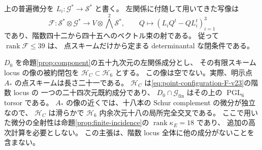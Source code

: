 上の普遍微分を $L_i:\mathscr G^*\to\mathscr S^*$ と書く。
左関係に付随して用いてきた写像は
\begin{equation}\label{eq:point-configuration-F-v23}
 \mathcal F:\mathscr S^*\otimes\mathscr G^*
 \longrightarrow V\otimes\bigwedge^2\mathscr S^*,
 \qquad
 Q\longmapsto(L_iQ^t-QL_i^t)_{i=1}^3
\end{equation}
であり、階数四十二から四十五へのベクトル束の射である。
従って $\operatorname{rank}\mathcal F\le39$ は、
点スキームだけから定まる determinantal な閉条件である。

$D_0$ を命題\ref{prop:component}の五十九次元の左関係成分とし、
その有限スキーム locus の像の被約閉包を $\mathcal H_C\subset\mathcal H_6$ とする。
この像は空でない。実際、明示点 $A_*$ の点スキームは長さ二十一である。
$\mathcal H_C$ は\eqref{eq:point-configuration-F-v23}の階数 locus の
一つの二十四次元既約成分であり、
$D_0\cap\mathcal G_{\mathrm{fin}}$ はその上の $\operatorname{PGL}_6$ torsor である。
$A_*$ の像の近くでは、十八本の Schur complement の微分が独立なので、
$\mathcal H_C$ は滑らかで $\mathcal H_6$ 内余次元十八の局所完全交叉である。
ここで用いた微分の全射性は命題\ref{prop:finite-incidence}の $\operatorname{rank}\kappa_E=18$ であり、
追加の高次計算を必要としない。
この主張は、階数 locus 全体に他の成分がないことを含まない。

